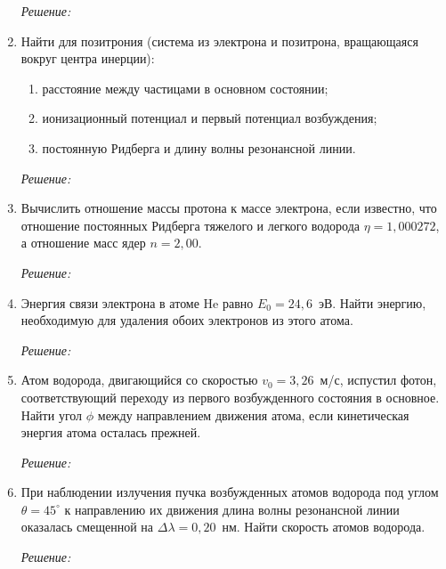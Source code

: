 \begin{enumerate}
\emph{Решение:}

\newpage

\item Найти для позитрония (система из электрона и позитрона, вращающаяся вокруг
центра инерции):
\begin{enumerate}
    \item расстояние между частицами в основном состоянии;
    \item ионизационный потенциал и первый потенциал возбуждения;
    \item постоянную Ридберга и длину волны резонансной линии.
\end{enumerate}

\emph{Решение:}

\newpage

\item Вычислить отношение массы протона к массе электрона, если известно, что
отношение постоянных Ридберга тяжелого и легкого водорода \(\eta = 1,\!000272\),
а отношение масс ядер \( n = 2,\!00 \).

\emph{Решение:}

\newpage

\item Энергия связи электрона в атоме He равно \( E_0 = 24,\!6 \)~эВ. Найти
энергию, необходимую для удаления обоих электронов из этого атома.

\emph{Решение:}

\newpage

\item Атом водорода, двигающийся со скоростью \( v_0 = 3,\!26 \)~м/с, испустил
фотон, соответствующий переходу из первого возбужденного состояния в основное.
Найти угол \( \phi \) между направлением движения атома, если кинетическая
энергия атома осталась прежней.

\emph{Решение:}

\newpage

\item При наблюдении излучения пучка возбужденных атомов водорода под углом
\( \theta = 45^\circ \) к направлению их движения длина волны резонансной линии
оказалась смещенной на \( \Delta\lambda = 0,\!20 \)~нм. Найти скорость атомов
водорода.

\emph{Решение:}

\end{enumerate}
